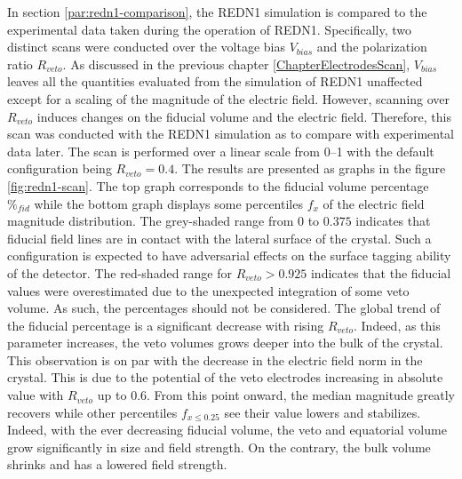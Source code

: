 In section \ref{par:redn1-comparison}, the REDN1 simulation is compared to the experimental data taken during the operation of REDN1. Specifically, two distinct scans were conducted over the voltage bias $V_{bias}$ and the polarization ratio $R_{veto}$. As discussed in the previous chapter \ref{ChapterElectrodesScan}, $V_{bias}$ leaves all the quantities evaluated from the simulation of REDN1 unaffected except for a scaling of the magnitude of the electric field.
However, scanning over $R_{veto}$ induces changes on the fiducial volume and the electric field. Therefore, this scan was conducted with the REDN1 simulation as to compare with experimental data later. The scan is performed over a linear scale from \SIrange{0}{1}{} with the default configuration being $R_{veto} = 0.4$. The results are presented as graphs in the figure \ref{fig:redn1-scan}. The top graph corresponds to the fiducial volume percentage $\%_{fid}$ while the bottom graph displays some percentiles $f_x$ of the electric field magnitude distribution. 
The grey-shaded range from $0$ to $0.375$ indicates that fiducial field lines are in contact with the lateral surface of the crystal. Such a configuration is expected to have adversarial effects on the surface tagging ability of the detector.
The red-shaded range for $R_{veto} > 0.925$ indicates that the fiducial values were overestimated due to the unexpected integration of some veto volume. As such, the percentages should not be considered.
The global trend of the fiducial percentage is a significant decrease with rising $R_{veto}$. Indeed, as this parameter increases, the veto volumes grows deeper into the bulk of the crystal. This observation is on par with the decrease in the electric field norm in the crystal. This is due to the potential of the veto electrodes increasing in absolute value with $R_{veto}$ up to $0.6$. From this point onward, the median magnitude greatly recovers while other percentiles $f_{x \leq 0.25}$ see their value lowers and stabilizes. Indeed, with the ever decreasing fiducial volume, the veto and equatorial volume grow significantly in size and field strength. On the contrary, the bulk volume shrinks and has a lowered field strength.

